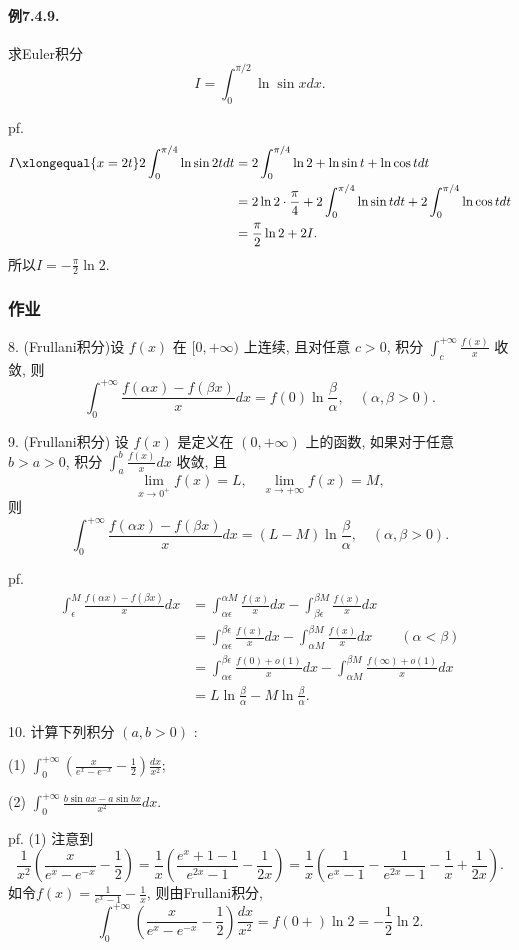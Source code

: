 \paragraph{例7.4.9.}

求Euler积分
\[
I=\int_{0}^{\pi/2}\ln\sin xdx.
\]

pf.
\begin{align*}
I\xlongequal{x=2t}2\int_{0}^{\pi/4}\ln\sin2tdt & =2\int_{0}^{\pi/4}\ln2+\ln\sin t+\ln\cos tdt\\
 & =2\ln2\cdot\frac{\pi}{4}+2\int_{0}^{\pi/4}\ln\sin tdt+2\int_{0}^{\pi/4}\ln\cos tdt\\
 & =\frac{\pi}{2}\ln2+2I.
\end{align*}
所以$I=-\frac{\pi}{2}\ln2$.

\subsubsection{作业}

8. (Frullani积分)设 $f(x)$ 在 $[0,+\infty)$ 上连续, 且对任意 $c>0$, 积分 $\int_{c}^{+\infty}\frac{f(x)}{x}$
收敛, 则 
\[
\int_{0}^{+\infty}\frac{f(\alpha x)-f(\beta x)}{x}dx=f(0)\ln\frac{\beta}{\alpha},\quad(\alpha,\beta>0).
\]

9. (Frullani积分) 设 $f(x)$ 是定义在 $(0,+\infty)$ 上的函数, 如果对于任意 $b>a>0$,
积分 $\int_{a}^{b}\frac{f(x)}{x}dx$ 收敛, 且 
\[
\lim_{x\rightarrow0^{+}}f(x)=L,\quad\lim_{x\rightarrow+\infty}f(x)=M,
\]
则 
\[
\int_{0}^{+\infty}\frac{f(\alpha x)-f(\beta x)}{x}dx=(L-M)\ln\frac{\beta}{\alpha},\quad(\alpha,\beta>0).
\]

pf. 
\begin{align*}
\int_{\epsilon}^{M}\frac{f(\alpha x)-f(\beta x)}{x}dx & =\int_{\alpha\epsilon}^{\alpha M}\frac{f(x)}{x}dx-\int_{\beta\epsilon}^{\beta M}\frac{f(x)}{x}dx\\
 & =\int_{\alpha\epsilon}^{\beta\epsilon}\frac{f(x)}{x}dx-\int_{\alpha M}^{\beta M}\frac{f(x)}{x}dx\qquad(\alpha<\beta)\\
 & =\int_{\alpha\epsilon}^{\beta\epsilon}\frac{f(0)+o(1)}{x}dx-\int_{\alpha M}^{\beta M}\frac{f(\infty)+o(1)}{x}dx\\
 & =L\ln\frac{\beta}{\alpha}-M\ln\frac{\beta}{\alpha}.
\end{align*}

10. 计算下列积分 $(a,b>0)$ : 

(1) $\int_{0}^{+\infty}\left(\frac{x}{e^{x}-e^{-x}}-\frac{1}{2}\right)\frac{dx}{x^{2}}$; 

(2) $\int_{0}^{+\infty}\frac{b\sin ax-a\sin bx}{x^{2}}dx$.

pf. (1) 注意到
\[
\frac{1}{x^{2}}\left(\frac{x}{e^{x}-e^{-x}}-\frac{1}{2}\right)=\frac{1}{x}\left(\frac{e^{x}+1-1}{e^{2x}-1}-\frac{1}{2x}\right)=\frac{1}{x}\left(\frac{1}{e^{x}-1}-\frac{1}{e^{2x}-1}-\frac{1}{x}+\frac{1}{2x}\right).
\]
如令$f(x)=\frac{1}{e^{x}-1}-\frac{1}{x}$, 则由Frullani积分, 
\[
\int_{0}^{+\infty}\left(\frac{x}{e^{x}-e^{-x}}-\frac{1}{2}\right)\frac{dx}{x^{2}}=f(0+)\ln2=-\frac{1}{2}\ln2.
\]

